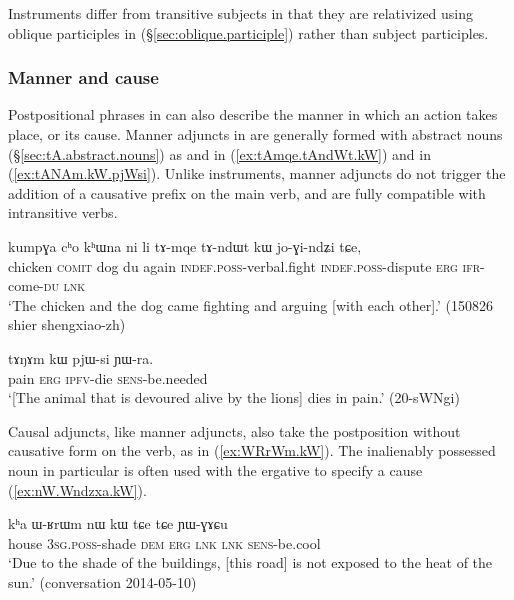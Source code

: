 Instruments differ from transitive subjects in that they are relativized using oblique participles in  (§\ref{sec:oblique.participle}) rather than subject participles.
 

\subsubsection{Manner and cause} \label{sec:manner.nominal.kW}
  
Postpositional phrases in  can also describe the manner in which an action takes place, or its cause. Manner adjuncts in  are generally formed with abstract nouns (§\ref{sec:tA.abstract.nouns}) as  and   in (\ref{ex:tAmqe.tAndWt.kW}) and  in (\ref{ex:tANAm.kW.pjWsi}). Unlike instruments, manner adjuncts do not trigger the addition of a causative prefix on the main verb, and are fully compatible with intransitive verbs.

\begin{exe}
\ex \label{ex:tAmqe.tAndWt.kW}
 \gll kumpɣa cʰo kʰɯna ni li tɤ-mqe tɤ-ndɯt kɯ jo-ɣi-ndʑi tɕe, \\
 chicken \textsc{comit} dog du again \textsc{indef}.\textsc{poss}-verbal.fight \textsc{indef}.\textsc{poss}-dispute \textsc{erg} \textsc{ifr}-come-\textsc{du} \textsc{lnk} \\
 \glt `The chicken and the dog came fighting and arguing [with each other].' (150826 shier shengxiao-zh)
\end{exe}

\begin{exe}
\ex \label{ex:tANAm.kW.pjWsi}
 \gll tɤŋɤm kɯ pjɯ-si ɲɯ-ra. \\
 pain \textsc{erg} \textsc{ipfv}-die \textsc{sens}-be.needed \\
 \glt `[The animal that is devoured alive by the lions] dies in pain.' (20-sWNgi) 
\end{exe}

Causal adjuncts, like manner adjuncts, also take the postposition  without causative form on the verb, as in (\ref{ex:WRrWm.kW}). The inalienably possessed noun  in particular is often used with the ergative to specify a cause  (\ref{ex:nW.Wndzxa.kW}). 

\begin{exe}
\ex \label{ex:WRrWm.kW}
 \gll   kʰa ɯ-ʁrɯm nɯ kɯ tɕe tɕe ɲɯ-ɣɤɕu \\
house \textsc{3sg}.\textsc{poss}-shade \textsc{dem} \textsc{erg} \textsc{lnk} \textsc{lnk}  \textsc{sens}-be.cool \\
\glt `Due to the shade of the buildings, [this road] is not exposed to the heat of the sun.' (conversation 2014-05-10)
\end{exe}

